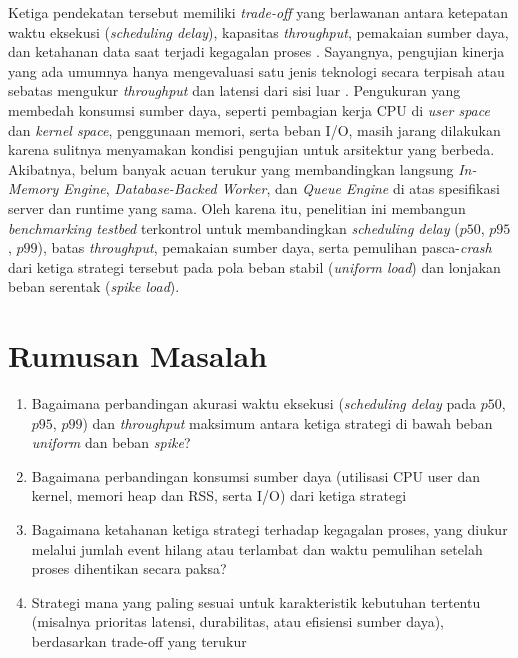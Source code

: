 Ketiga pendekatan tersebut memiliki \textit{trade-off} yang berlawanan antara ketepatan waktu eksekusi (\textit{scheduling delay}), kapasitas \textit{throughput}, pemakaian sumber daya, dan ketahanan data saat terjadi kegagalan proses \cite{kleppmann2026designing}. Sayangnya, pengujian kinerja yang ada umumnya hanya mengevaluasi satu jenis teknologi secara terpisah atau sebatas mengukur \textit{throughput} dan latensi dari sisi luar \cite{dobbelaere2017kafkaversusrabbitmq}. Pengukuran yang membedah konsumsi sumber daya, seperti pembagian kerja CPU di \textit{user space} dan \textit{kernel space}, penggunaan memori, serta beban I/O, masih jarang dilakukan karena sulitnya menyamakan kondisi pengujian untuk arsitektur yang berbeda. Akibatnya, belum banyak acuan terukur yang membandingkan langsung \textit{In-Memory Engine}, \textit{Database-Backed Worker}, dan \textit{Queue Engine} di atas spesifikasi server dan runtime yang sama. Oleh karena itu, penelitian ini membangun \textit{benchmarking testbed} terkontrol untuk membandingkan \textit{scheduling delay} ($p50$, $p95$, $p99$), batas \textit{throughput}, pemakaian sumber daya, serta pemulihan pasca-\textit{crash} dari ketiga strategi tersebut pada pola beban stabil (\textit{uniform load}) dan lonjakan beban serentak (\textit{spike load}). \par

\section{Rumusan Masalah} \label{I.Rumusan Masalah}
\begin{enumerate}
	\item Bagaimana perbandingan akurasi waktu eksekusi (\textit{scheduling delay} pada $p50$, $p95$, $p99$) dan \textit{throughput} maksimum antara ketiga strategi di bawah beban \textit{uniform} dan beban \textit{spike}?
	\item Bagaimana perbandingan konsumsi sumber daya (utilisasi CPU user dan kernel, memori heap dan RSS, serta I/O) dari ketiga strategi
	\item Bagaimana ketahanan ketiga strategi terhadap kegagalan proses, yang diukur melalui jumlah event hilang atau terlambat dan waktu pemulihan setelah proses dihentikan secara paksa?
	\item Strategi mana yang paling sesuai untuk karakteristik kebutuhan tertentu (misalnya prioritas latensi, durabilitas, atau efisiensi sumber daya), berdasarkan trade-off yang terukur
\end{enumerate}

